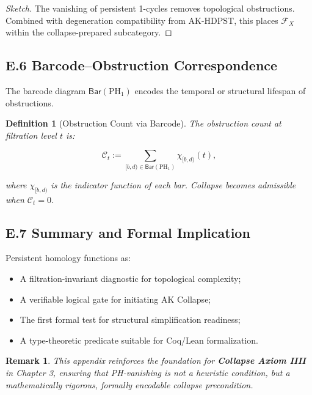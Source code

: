 \documentclass[11pt]{article}
\newtheorem{definition}[theorem]{Definition}
\newtheorem{remark}[theorem]{Remark}
\begin{document}
\begin{proof}[Sketch]
The vanishing of persistent 1-cycles removes topological obstructions. Combined with degeneration compatibility from AK-HDPST, this places \( \mathcal{F}_X \) within the collapse-prepared subcategory.
\end{proof}

\subsection*{E.6 Barcode–Obstruction Correspondence}

The barcode diagram \( \mathsf{Bar}(\mathrm{PH}_1) \) encodes the temporal or structural lifespan of obstructions.

\begin{definition}[Obstruction Count via Barcode]
The obstruction count at filtration level \( t \) is:

\[
\mathcal{C}_t := \sum_{[b,d) \in \mathsf{Bar}(\mathrm{PH}_1)} \chi_{[b,d)}(t),
\]

where \( \chi_{[b,d)} \) is the indicator function of each bar. Collapse becomes admissible when \( \mathcal{C}_t = 0 \).
\end{definition}

\subsection*{E.7 Summary and Formal Implication}

Persistent homology functions as:

\begin{itemize}
    \item A filtration-invariant diagnostic for topological complexity;
    \item A verifiable logical gate for initiating AK Collapse;
    \item The first formal test for structural simplification readiness;
    \item A type-theoretic predicate suitable for Coq/Lean formalization.
\end{itemize}

\begin{remark}
This appendix reinforces the foundation for \textbf{Collapse Axiom IIII} in Chapter 3, ensuring that PH-vanishing is not a heuristic condition, but a mathematically rigorous, formally encodable collapse precondition.
\end{remark}
\end{document}
